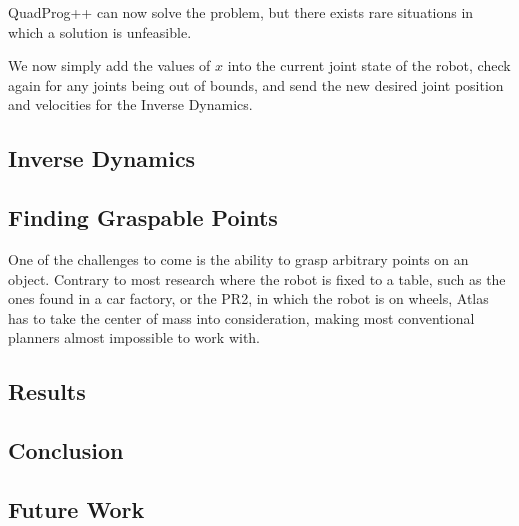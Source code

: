 \documentclass[12pt]{report}
\begin{document}
QuadProg++ can now solve the problem, but there exists rare situations in which a solution is unfeasible. 

We now simply add the values of $x$ into the current joint state of the robot, check again for any joints being out of bounds, and send the new desired joint position and velocities for the Inverse Dynamics.

\subsection{Inverse Dynamics}


\subsection{Finding Graspable Points}
One of the challenges to come is the ability to grasp arbitrary points on an object. Contrary to most research where the robot is fixed to a table, such as the ones found in a car factory, or the PR2, in which the robot is on wheels, Atlas has to take the center of mass into consideration, making most conventional planners almost impossible to work with.

\subsection{Results}

\subsection{Conclusion}

\subsection{Future Work}

\end{document}
